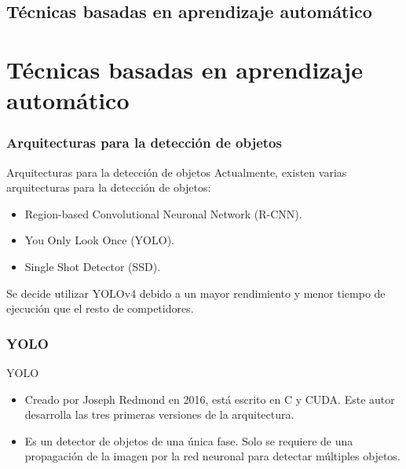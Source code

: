 \documentclass[11pt]{beamer}
\begin{document}
        \subsection{Técnicas basadas en aprendizaje automático}
        \section*{Técnicas basadas en aprendizaje automático}
        
        \subsubsection{Arquitecturas para la detección de objetos}
        \begin{frame}{Arquitecturas para la detección de objetos}
            Actualmente, existen varias arquitecturas para la detección de objetos:
            \begin{itemize}
                \item Region-based Convolutional Neuronal Network (R-CNN).
                \item You Only Look Once (YOLO).
                \item Single Shot Detector (SSD).
            \end{itemize}
            Se decide utilizar YOLOv4 debido a un mayor rendimiento y menor tiempo de ejecución que el resto de competidores.
        \end{frame}
        
        \subsubsection{YOLO}
        \begin{frame}{YOLO}
            \begin{itemize}
                \item Creado por Joseph Redmond en 2016, está escrito en C y CUDA. Este autor desarrolla las tres primeras versiones de la arquitectura.
                \item Es un detector de objetos de una única fase. Solo se requiere de una propagación de la imagen por la red neuronal para detectar múltiples objetos.
            \end{itemize}
        \end{frame}

        
\end{document}
